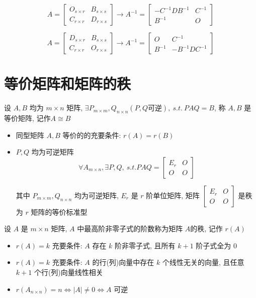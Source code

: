 \begin{corollary}[分块矩阵逆矩阵]
	  $$A = \begin{bmatrix}
		O_{s\times r} & B_{s\times s}\\
		C_{r\times r} & D_{r\times s}
	  \end{bmatrix} \to 
	  A^{-1} = \begin{bmatrix}
		-C^{-1}DB^{-1} & C^{-1}\\
		B^{-1}         & O
	  \end{bmatrix}$$

	  $$A = \begin{bmatrix}
		D_{s\times r} & B_{s\times s}\\
		C_{r\times r} & O_{r\times s}
	  \end{bmatrix} \to 
	  A^{-1} = \begin{bmatrix}
		O      & C^{-1}\\
		B^{-1} & -B^{-1}DC^{-1}
	  \end{bmatrix}$$

\end{corollary}

\section{等价矩阵和矩阵的秩}

\begin{definition}[等价矩阵]
	
	设 $A,B$ 均为 $m\times n$ 矩阵, $\exists P_{m\times m},Q_{n\times n}(P,Q\text{可逆}),\ s.t.\ PAQ=B$, 
	称 $A,B$ 是等价矩阵, 记作$A\cong B$
	
	\begin{itemize}
		\item 同型矩阵 $A, B$ 等价的的充要条件: $r(A) = r(B)$
		\item $P,Q$ 均为可逆矩阵
		$$\forall A_{m\times n}, \exists P,Q,\ s.t. PAQ = \begin{bmatrix} E_{r} & O\\ O & O\end{bmatrix}$$

		其中 $P_{m\times m}, Q_{n\times n}$ 均为可逆矩阵, $E_{r}$ 是 $r$ 阶单位矩阵, 
		矩阵 $\begin{bmatrix} E_{r} & O\\ O & O\end{bmatrix}$ 是秩为 $r$ 矩阵的等价标准型
	\end{itemize}
\end{definition}

\begin{definition}[矩阵的秩]
		
	设 $A$ 是 $m\times n$ 矩阵, $A$ 中最高阶非零子式的阶数称为矩阵 $A$的秩, 记作 $r(A)$
	
	\begin{itemize}
		\item $r(A) = k$ 充要条件: $A$ 存在 $k$ 阶非零子式, 且所有 $k+1$ 阶子式全为 $0$
		\item $r(A) = k$ 充要条件: $A$ 的行(列)向量中存在 $k$ 个线性无关的向量, 且任意 $k+1$ 个行(列)向量线性相关
		\item $r(A_{n\times n}) = n\Leftrightarrow |A| \neq 0 \Leftrightarrow A$ 可逆
	\end{itemize}
\end{definition}

